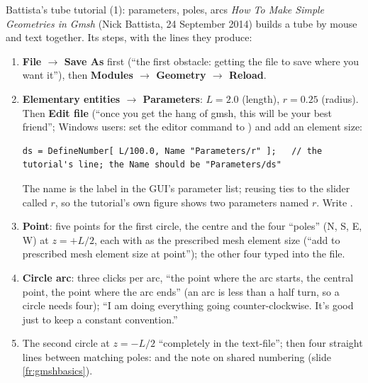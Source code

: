 \documentclass[aspectratio=169,11pt]{beamer}
\begin{document}
\begin{frame}[fragile]{Battista's tube tutorial (1): parameters, poles, arcs}
\label{fr:battista}
\footnotesize
\emph{How To Make Simple Geometries in Gmsh} (Nick Battista, 24 September 2014) builds a tube by mouse and text together. Its steps, with the  lines they produce:
\begin{enumerate}
  \item \textbf{File $\to$ Save As}  first (``the first obstacle: getting the file to save where you want it''), then \textbf{Modules $\to$ Geometry $\to$ Reload}.
  \item \textbf{Elementary entities $\to$ Parameters}: $L = 2.0$ (length), $r = 0.25$ (radius). Then \textbf{Edit file} (``once you get the hang of gmsh, this will be your best friend''; Windows users: set the editor command to ) and add an element size:
\begin{lstlisting}[style=geotiny]
ds = DefineNumber[ L/100.0, Name "Parameters/r" ];   // the tutorial's line; the Name should be "Parameters/ds"
\end{lstlisting}
  The name is the label in the GUI's parameter list; reusing  ties  to the slider called $r$, so the tutorial's own figure shows two parameters named $r$. Write .
  \item \textbf{Point}: five points for the first circle, the centre and the four ``poles'' (N, S, E, W) at $z = +L/2$, each with  as the prescribed mesh element size (``add  to prescribed mesh element size at point''); the other four typed into the file.
  \item \textbf{Circle arc}: three clicks per arc, ``the point where the arc starts, the central point, the point where the arc ends'' (an arc is less than a half turn, so a circle needs four); ``I am doing everything going counter-clockwise. It's good just to keep a constant convention.''
  \item The second circle at $z = -L/2$ ``completely in the text-file''; then four straight lines between matching poles:  and the note on shared numbering (slide \ref{fr:gmshbasics}).
\end{enumerate}
\end{frame}
\end{document}
